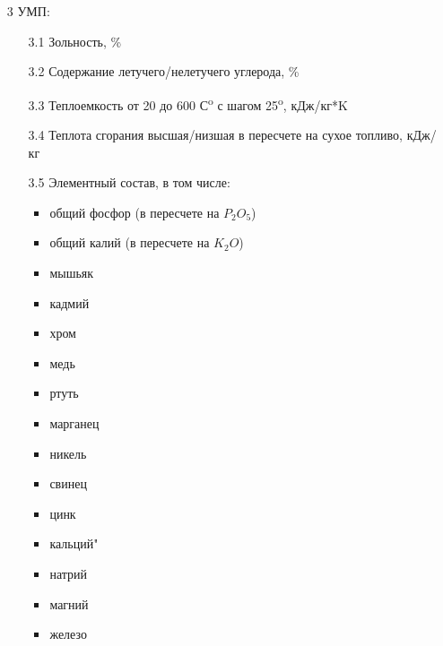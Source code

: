 \documentclass[russian,utf8]{eskdtext}
\begin{document}
\begin{enumerate}
   \item[3] УМП:
      \begin{enumerate}
      \item[3.1] Зольность, \%
      \item[3.2] Содержание летучего/нелетучего углерода, \%
      \item[3.3] Теплоемкость от 20 до 600 С\textsuperscript{o} с шагом 25\textsuperscript{o}, кДж/кг*K
      \item[3.4] Теплота сгорания высшая/низшая в пересчете на сухое топливо, кДж/кг
      \item[3.5] Элементный состав, в том числе:
         \begin{itemize}
         \item общий фосфор (в пересчете на  $P_{2}O_{5}$)
         \item общий калий (в пересчете на  $K_{2}O$)
         \item мышьяк
         \item кадмий
         \item хром
         \item медь
         \item ртуть
         \item марганец
         \item никель
         \item свинец
         \item цинк
         \item кальций"
         \item натрий
         \item магний
         \item железо
         \end{itemize}
      \end{enumerate}   
      

\end{enumerate}
\end{document}
